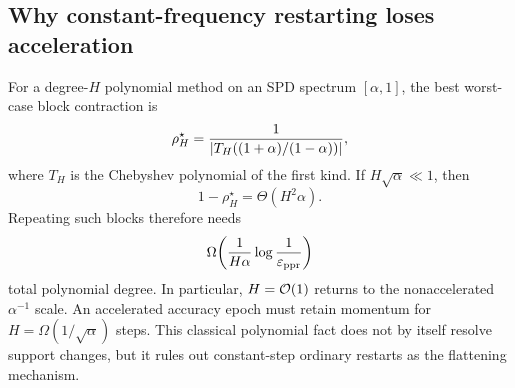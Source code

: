 \subsection{Why constant-frequency restarting loses acceleration}

For a degree-$H$ polynomial method on an SPD spectrum $[\alpha,1]$, the best
worst-case block contraction is
\begin{equation}
  \rho_H^\star
  =\frac1{\left\lvert T_H((1+\alpha)/(1-\alpha)) \right\rvert},
  \label{eq:cheb-block}
\end{equation}
where $T_H$ is the Chebyshev polynomial of the first kind.  If
$H\sqrt\alpha\ll1$, then
\begin{equation}
  1-\rho_H^\star=\Theta(H^2\alpha).
  \label{eq:short-block}
\end{equation}
Repeating such blocks therefore needs
\begin{equation}
  \Omega\!\left(\frac1{H\alpha}\log\frac1{\varepsilon_{\mathrm{ppr}}}\right)
  \label{eq:restart-lower}
\end{equation}
total polynomial degree.  In particular, $H=\mathcal{O}(1)$ returns to the
nonaccelerated $\alpha^{-1}$ scale.  An accelerated accuracy epoch must retain
momentum for $H=\Omega(1/\sqrt\alpha)$ steps.  This classical polynomial fact
does not by itself resolve support changes, but it rules out constant-step
ordinary restarts as the flattening mechanism.
